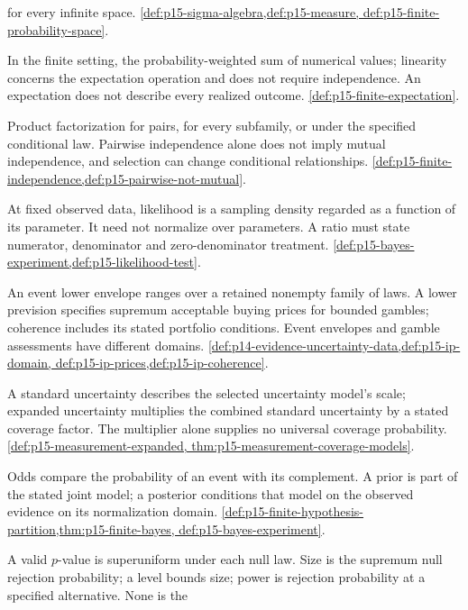 \begin{description}[style=nextline,leftmargin=0pt]
for every infinite space. \cref{def:p15-sigma-algebra,def:p15-measure,
def:p15-finite-probability-space}.
\item[Expectation.]
In the finite setting, the probability-weighted sum of numerical values;
linearity concerns the expectation operation and does not require
independence. An expectation does not describe every realized outcome.
\cref{def:p15-finite-expectation}.
\item[Independence: pairwise, mutual, conditional.]
Product factorization for pairs, for every subfamily, or under the
specified conditional law. Pairwise independence alone does not imply
mutual independence, and selection can change conditional relationships.
\cref{def:p15-finite-independence,def:p15-pairwise-not-mutual}.
\item[Likelihood; likelihood ratio.]
At fixed observed data, likelihood is a sampling density regarded as a
function of its parameter. It need not normalize over parameters. A ratio
must state numerator, denominator and zero-denominator treatment.
\cref{def:p15-bayes-experiment,def:p15-likelihood-test}.
\item[Lower probability; lower prevision; coherence.]
An event lower envelope ranges over a retained nonempty family of laws.
A lower prevision specifies supremum acceptable buying prices for
bounded gambles; coherence includes its stated portfolio conditions.
Event envelopes and gamble assessments have different domains.
\cref{def:p14-evidence-uncertainty-data,def:p15-ip-domain,
def:p15-ip-prices,def:p15-ip-coherence}.
\item[Measurement uncertainty; expanded uncertainty.]
A standard uncertainty describes the selected uncertainty model's scale;
expanded uncertainty multiplies the combined standard uncertainty by
a stated coverage factor. The multiplier alone supplies no universal
coverage probability. \cref{def:p15-measurement-expanded,
thm:p15-measurement-coverage-models}.
\item[Odds; prior; posterior.]
Odds compare the probability of an event with its complement. A prior is
part of the stated joint model; a posterior conditions that model on the
observed evidence on its normalization domain.
\cref{def:p15-finite-hypothesis-partition,thm:p15-finite-bayes,
def:p15-bayes-experiment}.
\item[\(p\)-value; level; size; power.]
A valid \(p\)-value is superuniform under each null law. Size is the
supremum null rejection probability; a level bounds size; power is
rejection probability at a specified alternative. None is the

\end{description}
